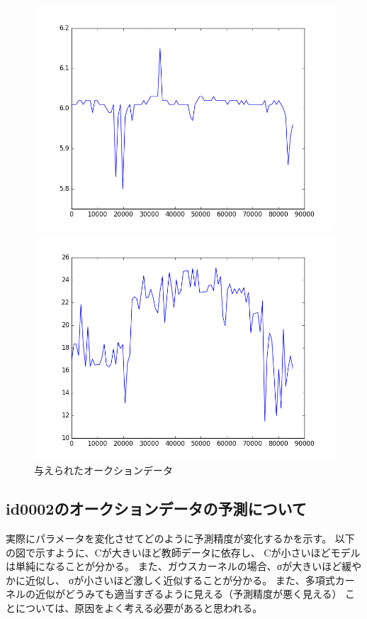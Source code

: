\documentclass[]{jsarticle}
\begin{document}
\begin{figure}[htbp]
\begin{minipage}[b]{0.5\hsize}
 \end{minipage}
 \begin{minipage}[b]{0.5\hsize}
  \includegraphics[scale=0.4]{./images/id0003.png}
 \end{minipage}
 \begin{minipage}[b]{0.5\hsize}
  \includegraphics[scale=0.4]{./images/id0004.png}
 \end{minipage}
 \caption{ 与えられたオークションデータ}
\end{figure}
\newpage
\subsection{ id0002のオークションデータの予測について }
実際にパラメータを変化させてどのように予測精度が変化するかを示す。
以下の図で示すように、Cが大きいほど教師データに依存し、
Cが小さいほどモデルは単純になることが分かる。
また、ガウスカーネルの場合、σが大きいほど緩やかに近似し、
σが小さいほど激しく近似することが分かる。
また、多項式カーネルの近似がどうみても適当すぎるように見える（予測精度が悪く見える）
ことについては、原因をよく考える必要があると思われる。
\end{document}
